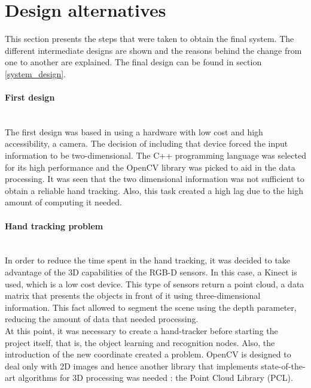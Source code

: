 \section{Design alternatives}
This section presents the steps that were taken to obtain the final system. 
The different intermediate designs are shown and the reasons behind the change from one to another are explained. 
The final design can be found in section \ref{system_design}.
\\

\paragraph{First design}
\mbox{} \\

The first design was based in using a hardware with low cost and high accessibility, a camera. The decision of including that device forced the input information to be two-dimensional. The C++ programming language was selected for its high performance and the OpenCV library was picked to aid in the data processing. It was seen that the two dimensional information was not sufficient to obtain a reliable hand tracking. Also, this task created a high lag due to the high amount of computing it needed. 
\\


\paragraph{Hand tracking problem}
\mbox{} \\

In order to reduce the time spent in the hand tracking, it was decided to take advantage of the 3D capabilities of the RGB-D sensors. 
In this case, a Kinect is used, which is a low cost device. 
This type of sensors return a point cloud, a data matrix that presents the objects in front of it using three-dimensional information. 
This fact allowed to segment the scene using the depth parameter, reducing the amount of data that needed processing. 
\\

At this point, it was necessary to create a hand-tracker before starting the project itself, that is, the object learning and recognition nodes. 
Also, the introduction of the new coordinate created a problem. OpenCV is designed to deal only with 2D images and hence another library that implements state-of-the-art algorithms for 3D processing was needed : the Point Cloud Library (PCL).
\\


